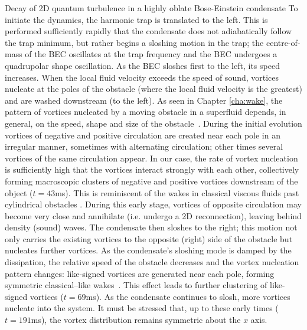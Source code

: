 \begin{chapter}{\label{cha:shin}Decay of 2D quantum turbulence in a highly oblate Bose-Einstein condensate}
To initiate the dynamics, the harmonic trap is translated to the left.  This is performed sufficiently rapidly that the condensate does not adiabatically follow the trap minimum, but rather begins a sloshing motion in the trap; the centre-of-mass of the BEC oscillates at the trap frequency and the BEC undergoes a quadrupolar shape oscillation. As the BEC sloshes first to the left, its speed increases.  When the local fluid velocity exceeds the speed of sound, vortices nucleate \cite{frisch92} at the poles of the obstacle
(where the local fluid velocity is the greatest) 
and are washed downstream (to the left).  
As seen in Chapter \ref{cha:wake}, the pattern of vortices nucleated by a moving obstacle 
in a superfluid depends, in general, on the  speed, shape and size of 
the obstacle~\citep{jma00,saito10,stagg_parker_14}. 
During the initial evolution vortices of negative
and positive circulation are created near each pole in an 
irregular manner, sometimes with alternating circulation;  
other times several vortices of the same circulation appear.  
In our case, the rate of vortex nucleation is sufficiently 
high that the vortices interact strongly with each other, 
collectively forming macroscopic clusters of negative and positive 
vortices downstream of the object ($t=43$ms).  This is reminiscent of the wakes in classical viscous fluids past cylindrical obstacles \cite{stagg_parker_14}.  
During this early stage, vortices of opposite 
circulation may become very close and annihilate (i.e. undergo 
a 2D reconnection), leaving behind density (sound) waves. The condensate then sloshes to the right; this 
motion not only carries the existing vortices to the opposite 
(right) side of the obstacle but nucleates further vortices. 
As the condensate's sloshing mode is damped by 
the dissipation, the relative speed of the obstacle decreases
and the vortex nucleation pattern changes: 
like-signed vortices are generated near each pole, 
forming symmetric classical--like wakes~\cite{stagg_parker_14}. 
This effect leads to further clustering of like-signed vortices   
($t=69$ms). As the condensate continues to slosh, more
vortices nucleate into the system. It must be stressed that,
up to these early times ($t=191$ms), the vortex distribution remains symmetric 
about the $x$ axis.


\end{chapter}
